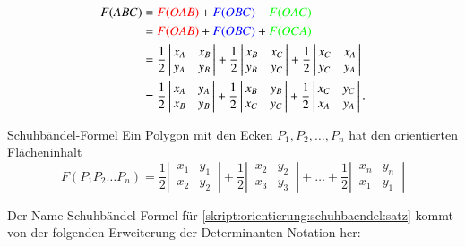 \begin{align*}
F(ABC)
&=
{\color{red}F(OAB)} + {\color{blue}F(OBC)} - {\color{green}F(OAC)}
\\
&=
{\color{red}F(OAB)} + {\color{blue}F(OBC)} + {\color{green}F(OCA)}
\\
&
=
\frac12 \left|\,\begin{matrix} x_A&x_B\\y_A&y_B\end{matrix}\,\right|
+
\frac12 \left|\,\begin{matrix} x_B&x_C\\y_B&y_C\end{matrix}\,\right|
+
\frac12 \left|\,\begin{matrix} x_C&x_A\\y_C&y_A\end{matrix}\,\right|
\\
&
=
\frac12 \left|\,\begin{matrix} x_A&y_A\\x_B&y_B\end{matrix}\,\right|
+
\frac12 \left|\,\begin{matrix} x_B&y_B\\x_C&y_C\end{matrix}\,\right|
+
\frac12 \left|\,\begin{matrix} x_C&y_C\\x_A&y_A\end{matrix}\,\right|.
\end{align*}
\begin{satz}{Schuhbändel-Formel}
Ein Polygon mit den Ecken $P_1,P_2,\dots,P_n$ hat den orientierten 
Flächeninhalt
\begin{equation}
F(P_1P_2\dots P_n) =
\frac12\left|\,\begin{matrix}x_1&y_1\\x_2&y_2\end{matrix}\,\right|
+
\frac12\left|\,\begin{matrix}x_2&y_2\\x_3&y_3\end{matrix}\,\right|
+\dots+
\frac12\left|\,\begin{matrix}x_n&y_n\\x_1&y_1\end{matrix}\,\right|
\label{skript:orientierung:schuhbaendel:satz}
\end{equation}
\end{satz}
Der Name Schuhbändel-Formel für
\eqref{skript:orientierung:schuhbaendel:satz}
kommt von der folgenden Erweiterung der Determinanten-Notation her:
